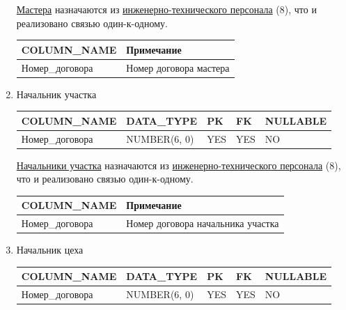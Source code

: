\begin{enumerate}
\begin{tabular}{|p{4cm}|p{3cm}|p{1cm}|p{1cm}|p{2cm}|}
    \end{tabular}

    \underline{Мастера} назначаются из \underline{инженерно-технического персонала} (8), что и реализовано связью один-к-одному.

    \begin{tabular}{|p{4cm}|p{5cm}|} \hline

        {\bf COLUMN\_NAME} & {\bf Примечание} \\ \hline
        Номер\_договора & Номер договора мастера \\ \hline

    \end{tabular}

    \item{Начальник участка}

    \begin{tabular}{|p{4cm}|p{3cm}|p{1cm}|p{1cm}|p{2cm}|} \hline

        {\bf COLUMN\_NAME} & {\bf DATA\_TYPE} & {\bf PK} & {\bf FK} & {\bf NULLABLE} \\ \hline
        Номер\_договора & NUMBER(6, 0) & YES & YES & NO \\ \hline

    \end{tabular}

    \underline{Начальники участка} назначаются из \underline{инженерно-технического персонала} (8), что и реализовано связью один-к-одному.

    \begin{tabular}{|p{4cm}|p{5cm}|} \hline

        {\bf COLUMN\_NAME} & {\bf Примечание} \\ \hline
        Номер\_договора & Номер договора начальника участка \\ \hline

    \end{tabular}

    \item{Начальник цеха}

    \begin{tabular}{|p{4cm}|p{3cm}|p{1cm}|p{1cm}|p{2cm}|} \hline

        {\bf COLUMN\_NAME} & {\bf DATA\_TYPE} & {\bf PK} & {\bf FK} & {\bf NULLABLE} \\ \hline
        Номер\_договора & NUMBER(6, 0) & YES & YES & NO \\ \hline

    \end{tabular}


\end{enumerate}
